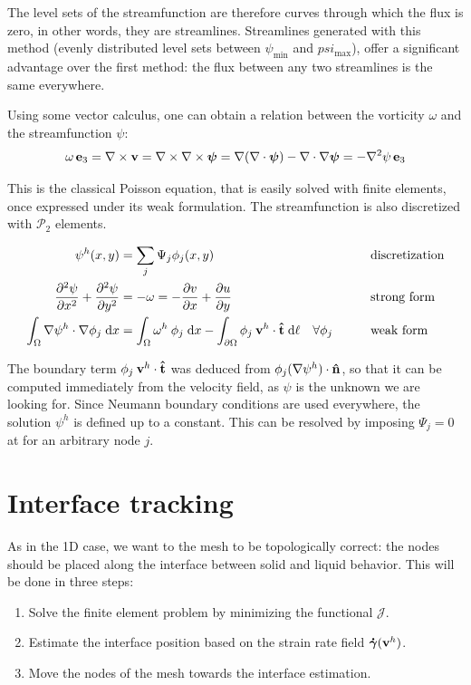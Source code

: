 \documentclass[11 pt]{report}
\begin{document}
The level sets of the streamfunction are therefore curves through which the flux is zero, in other words, they are streamlines. Streamlines generated with this method (evenly distributed level sets between $\psi_{\min}$ and $psi_{\max}$), offer a significant advantage over the first method: the flux between any two streamlines is the same everywhere.

Using some vector calculus, one can obtain a relation between the vorticity $\omega$ and the streamfunction $\psi$:
\begin{equation}
    \omega \,\mathbf{e}_3 = \nabla \times \mathbf{v} = \nabla \times \nabla \times \boldsymbol\psi = \nabla (\nabla \cdot \boldsymbol\psi) - \nabla \cdot \nabla \boldsymbol\psi = - \nabla^2 \psi \,\mathbf{e}_3
\end{equation}

This is the classical Poisson equation, that is easily solved with finite elements, once expressed under its weak formulation. The streamfunction is also discretized with $\mathcal{P}_2$ elements.
\begin{empheqboxed}
    \begin{equation}
        \begin{aligned}
            \psi^h(x,y) &= \sum_{j} \Psi_j \phi_j(x,y) && \text{discretization}\\
            \pdv[2]{\psi}{x} + \pdv[2]{\psi}{y} &= -\omega = -\pdv{v}{x} + \pdv{u}{y} && \text{strong form}\\
            \int_{\Omega} \nabla \psi^h \cdot \nabla \phi_j \;\dd x &= \int_{\Omega} \omega^h \:\phi_j\; \dd x - \int_{\partial \Omega} \phi_j \: \mathbf{v}^h \cdot \mathbf{\hat t} \;\dd \ell \quad \forall \phi_j\qquad && \text{weak form}
        \end{aligned}
    \end{equation}
\end{empheqboxed}
The boundary term $\phi_j \:\mathbf{v}^h\cdot \mathbf{\hat t}$ was deduced from $\phi_j (\nabla \psi^h) \cdot \mathbf{\hat n} $, so that it can be computed immediately from the velocity field, as $\psi$ is the unknown we are looking for. Since Neumann boundary conditions are used everywhere, the solution $\psi^h$ is defined up to a constant. This can be resolved by imposing $\Psi_j=0$ at for an arbitrary node $j$.

\section{Interface tracking}
As in the 1D case, we want to the mesh to be topologically correct: the nodes should be placed along the interface between solid and liquid behavior. This will be done in three steps:
\begin{enumerate}
    \item Solve the finite element problem by minimizing the functional $\mathcal{J}$.
    \item Estimate the interface position based on the strain rate field $\boldsymbol{\dot \gamma}(\mathbf{v}^h)$.
    \item Move the nodes of the mesh towards the interface estimation.
\end{enumerate}
\end{document}

